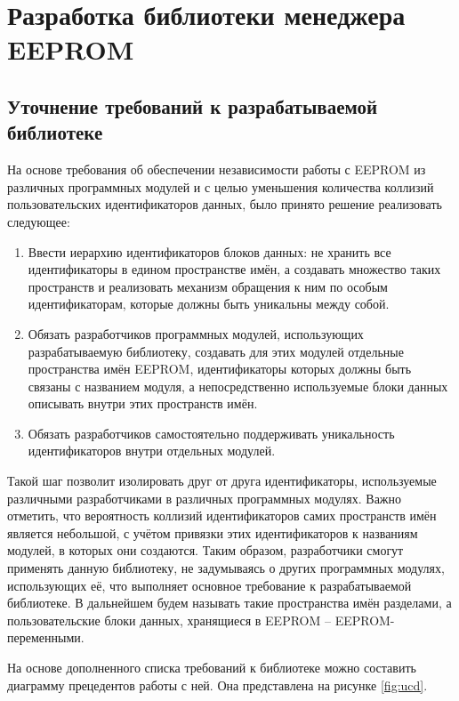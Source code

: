 \chapter{Разработка библиотеки менеджера EEPROM}

\section{Уточнение требований к разрабатываемой библиотеке}

На основе требования об обеспечении независимости работы с EEPROM из различных программных модулей и с целью уменьшения количества коллизий пользовательских идентификаторов данных, было принято решение реализовать следующее:
\begin{enumerate}
	\item Ввести иерархию идентификаторов блоков данных: не хранить все идентификаторы в едином пространстве имён, а создавать множество таких пространств и реализовать механизм обращения к ним по особым идентификаторам, которые должны быть уникальны между собой.
	\item Обязать разработчиков программных модулей, использующих разрабатываемую библиотеку, создавать для этих модулей отдельные пространства имён EEPROM, идентификаторы которых должны быть связаны с названием модуля, а непосредственно используемые блоки данных описывать внутри этих пространств имён.
	\item Обязать разработчиков самостоятельно поддерживать уникальность идентификаторов внутри отдельных модулей.
\end{enumerate}

Такой шаг позволит изолировать друг от друга идентификаторы, используемые различными разработчиками в различных программных модулях.
Важно отметить, что вероятность коллизий идентификаторов самих пространств имён является небольшой, с учётом привязки этих идентификаторов к названиям модулей, в которых они создаются.
Таким образом, разработчики смогут применять данную библиотеку, не задумываясь о других программных модулях, использующих её, что выполняет основное требование к разрабатываемой библиотеке.
В дальнейшем будем называть такие пространства имён разделами, а пользовательские блоки данных, хранящиеся в EEPROM -- EEPROM-переменными.

На основе дополненного списка требований к библиотеке можно составить диаграмму прецедентов работы с ней. Она представлена на рисунке \ref{fig:ucd}.



